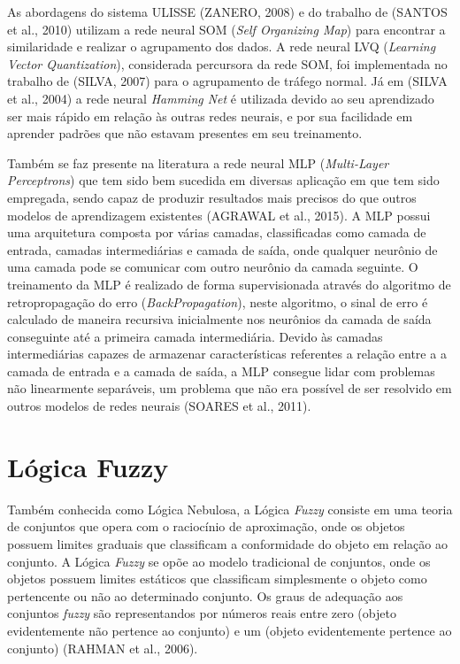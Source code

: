 \documentclass[12pt,openright,oneside,a4paper,english,spanish,brazil]{unifil}
\begin{document}
\indent As abordagens do sistema ULISSE (ZANERO, 2008) e do trabalho de (SANTOS et al., 2010) utilizam a rede neural SOM (\textit{Self Organizing Map}) para encontrar a similaridade e realizar o agrupamento dos dados. A rede neural LVQ (\textit{Learning Vector Quantization}), considerada percursora da rede SOM, foi implementada no trabalho de (SILVA, 2007) para o agrupamento de tráfego normal. Já em (SILVA et al., 2004) a rede neural \textit{Hamming Net} é utilizada devido ao seu aprendizado ser mais rápido em relação às outras redes neurais, e por sua facilidade em aprender padrões que não estavam presentes em seu treinamento.

Também se faz presente na literatura a rede neural MLP (\textit{Multi-Layer Perceptrons}) que tem sido bem sucedida em diversas aplicação em que tem sido empregada, sendo capaz de produzir resultados mais precisos do que outros modelos de aprendizagem existentes (AGRAWAL et al., 2015). A MLP possui uma arquitetura composta por várias camadas, classificadas como camada de entrada, camadas intermediárias e camada de saída, onde qualquer neurônio de uma camada pode se comunicar com outro neurônio da camada seguinte. O treinamento da MLP é realizado de forma supervisionada através do algoritmo  de retropropagação do erro (\textit{BackPropagation}), neste algoritmo, o sinal de erro é calculado de maneira recursiva inicialmente nos neurônios da camada de saída conseguinte  até a primeira camada intermediária. Devido às camadas intermediárias capazes de armazenar características referentes a relação entre a a camada de entrada e a camada de saída, a MLP consegue lidar com problemas não linearmente separáveis, um problema que não era possível de ser resolvido em outros modelos de redes neurais (SOARES et al., 2011).

  \section{Lógica Fuzzy}
\indent Também conhecida como Lógica Nebulosa, a Lógica \textit{Fuzzy} consiste em uma teoria de conjuntos que opera com o raciocínio de aproximação, onde os objetos possuem limites graduais que classificam a conformidade do objeto em relação ao conjunto. A Lógica \textit{Fuzzy} se opõe ao modelo tradicional de conjuntos, onde os objetos possuem limites estáticos que classificam simplesmente o objeto como pertencente ou não ao determinado conjunto. Os graus de adequação aos conjuntos \textit{fuzzy} são representandos por números reais entre zero (objeto evidentemente não pertence ao conjunto) e um (objeto evidentemente pertence ao conjunto) (RAHMAN et al., 2006).
\end{document}
